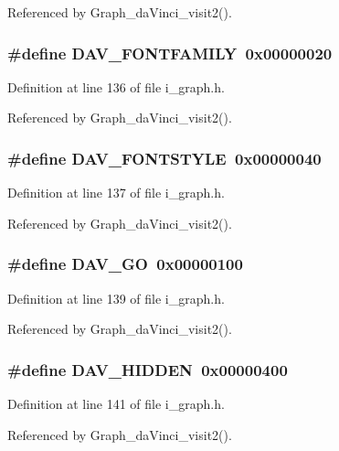 Referenced by Graph\_\-da\-Vinci\_\-visit2().
\subsubsection{\setlength{\rightskip}{0pt plus 5cm}\#define DAV\_\-FONTFAMILY~0x00000020}\label{i__graph_8h_d03f033576b358b53244765e70a2e856}




Definition at line 136 of file i\_\-graph.h.

Referenced by Graph\_\-da\-Vinci\_\-visit2().
\subsubsection{\setlength{\rightskip}{0pt plus 5cm}\#define DAV\_\-FONTSTYLE~0x00000040}\label{i__graph_8h_aae7a2afab0bfb1efa3f5ec7240d237a}




Definition at line 137 of file i\_\-graph.h.

Referenced by Graph\_\-da\-Vinci\_\-visit2().
\subsubsection{\setlength{\rightskip}{0pt plus 5cm}\#define DAV\_\-GO~0x00000100}\label{i__graph_8h_a68dc6b15691483aad22a7991918c09f}




Definition at line 139 of file i\_\-graph.h.

Referenced by Graph\_\-da\-Vinci\_\-visit2().
\subsubsection{\setlength{\rightskip}{0pt plus 5cm}\#define DAV\_\-HIDDEN~0x00000400}\label{i__graph_8h_494fd5fcceecd992a3fbf241ed95fc51}




Definition at line 141 of file i\_\-graph.h.

Referenced by Graph\_\-da\-Vinci\_\-visit2().
